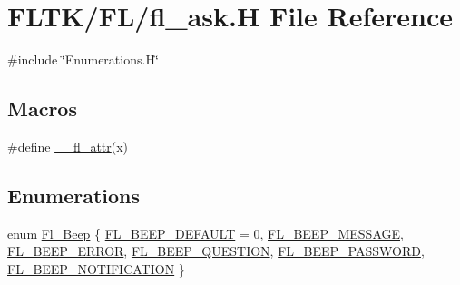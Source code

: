 \hypertarget{fl__ask_8_h}{}\section{F\+L\+T\+K/\+F\+L/fl\+\_\+ask.H File Reference}
\label{fl__ask_8_h}
{\ttfamily \#include \char`\"{}Enumerations.\+H\char`\"{}}\newline
\subsection*{Macros}
\begin{DoxyCompactItemize}
\item 
\#define \hyperlink{fl__ask_8_h_abd901bc7c322836b976d5ea9efc23258}{\+\_\+\+\_\+fl\+\_\+attr}(x)
\end{DoxyCompactItemize}
\subsection*{Enumerations}
\begin{DoxyCompactItemize}
\item 
enum \hyperlink{fl__ask_8_h_af2427850080f7b2ddc65f9a0f1e2067c}{Fl\+\_\+\+Beep} \{ \newline
\hyperlink{fl__ask_8_h_af2427850080f7b2ddc65f9a0f1e2067cadf3a64f31aaf6ba0c6b93a45da955feb}{F\+L\+\_\+\+B\+E\+E\+P\+\_\+\+D\+E\+F\+A\+U\+LT} = 0, 
\hyperlink{fl__ask_8_h_af2427850080f7b2ddc65f9a0f1e2067ca323e2f3912355ad35349ed5f2b35beb0}{F\+L\+\_\+\+B\+E\+E\+P\+\_\+\+M\+E\+S\+S\+A\+GE}, 
\hyperlink{fl__ask_8_h_af2427850080f7b2ddc65f9a0f1e2067caaaed2b8e072dc4d9d431c282c2e0fde1}{F\+L\+\_\+\+B\+E\+E\+P\+\_\+\+E\+R\+R\+OR}, 
\hyperlink{fl__ask_8_h_af2427850080f7b2ddc65f9a0f1e2067ca9fb3098ae806676dd5cf6b1a4369678c}{F\+L\+\_\+\+B\+E\+E\+P\+\_\+\+Q\+U\+E\+S\+T\+I\+ON}, 
\newline
\hyperlink{fl__ask_8_h_af2427850080f7b2ddc65f9a0f1e2067cacc279f31a556db7999ea30d507084a09}{F\+L\+\_\+\+B\+E\+E\+P\+\_\+\+P\+A\+S\+S\+W\+O\+RD}, 
\hyperlink{fl__ask_8_h_af2427850080f7b2ddc65f9a0f1e2067ca524eab61f5dc5fbcc2f47ba86fcb1a5d}{F\+L\+\_\+\+B\+E\+E\+P\+\_\+\+N\+O\+T\+I\+F\+I\+C\+A\+T\+I\+ON}
 \}
\end{DoxyCompactItemize}

